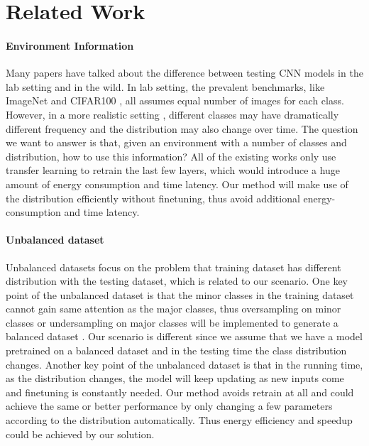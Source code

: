 \documentclass[pageno]{jpaper}
\begin{document}
\section{Related Work}
\paragraph{Environment Information}

Many papers have talked about the difference between testing CNN models in the lab setting and in the wild. In lab setting, the prevalent benchmarks, like ImageNet \cite{deng2009imagenet} and CIFAR100 \cite{krizhevsky2009learning}, all assumes equal number of images for each class. However, in a more realistic setting \cite{han2016mcdnn, shen2016fast}, different classes may have dramatically different frequency and the distribution may also change over time. The question we want to answer is that, given an environment with a number of classes and distribution, how to use this information? All of the existing works \cite{han2016mcdnn, shen2016fast} only use transfer learning to retrain the last few layers, which would introduce a huge amount of energy consumption and time latency. Our method will make use of the distribution efficiently without finetuning, thus avoid additional energy-consumption and time latency.

\paragraph{Unbalanced dataset}
Unbalanced datasets focus on the problem that training dataset has different distribution with the testing dataset, which is related to our scenario. One key point of the unbalanced dataset is that the minor classes in the training dataset cannot gain same attention as the major classes, thus oversampling on minor classes or undersampling on major classes will be implemented to generate a balanced dataset \cite{hoens2012learning, van2007experimental, wang2016dealing}. Our scenario is different since we assume that we have a model pretrained on a balanced dataset and in the testing time the class distribution changes. Another key point of the unbalanced dataset is that in the running time, as the distribution changes, the model will keep updating as new inputs come and finetuning is constantly needed. Our method avoids retrain at all and could achieve the same or better performance by only changing a few parameters according to the distribution automatically. Thus energy efficiency and speedup could be achieved by our solution.
\end{document}
